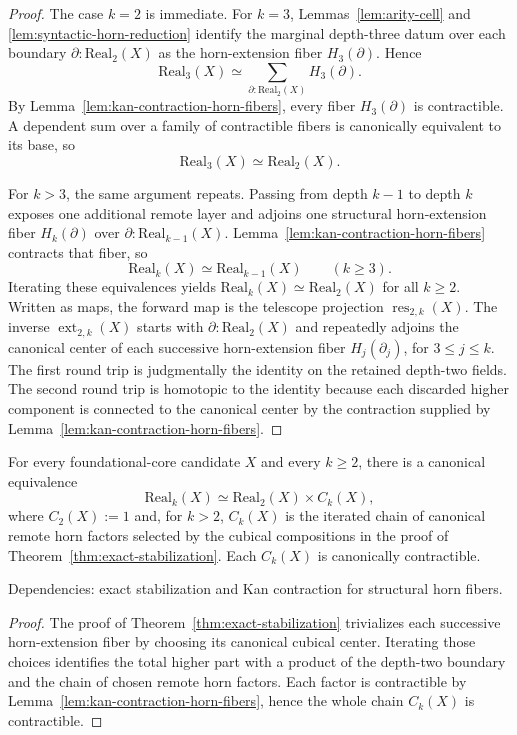 \documentclass{lmcs}
\newcommand{\res}{\operatorname{res}}
\newcommand{\ext}{\operatorname{ext}}
\begin{document}
\begin{proof}
The case \(k=2\) is immediate.  For \(k=3\), Lemmas~\ref{lem:arity-cell} and
\ref{lem:syntactic-horn-reduction} identify the marginal depth-three datum over each
boundary \(\partial:\mathrm{Real}_2(X)\) as the horn-extension fiber \(H_3(\partial)\).  Hence
\[
  \mathrm{Real}_3(X)
  \simeq
  \sum_{\partial:\mathrm{Real}_2(X)} H_3(\partial).
\]
By Lemma~\ref{lem:kan-contraction-horn-fibers}, every fiber \(H_3(\partial)\) is
contractible.  A dependent sum over a family of contractible fibers is canonically equivalent
to its base, so
\[
  \mathrm{Real}_3(X) \simeq \mathrm{Real}_2(X).
\]

For \(k>3\), the same argument repeats.  Passing from depth \(k-1\) to depth \(k\) exposes
one additional remote layer and adjoins one structural horn-extension fiber \(H_k(\partial)\)
over \(\partial:\mathrm{Real}_{k-1}(X)\).  Lemma~\ref{lem:kan-contraction-horn-fibers}
contracts that fiber, so
\[
  \mathrm{Real}_k(X) \simeq \mathrm{Real}_{k-1}(X)
  \qquad (k\geq 3).
\]
Iterating these equivalences yields \(\mathrm{Real}_k(X)\simeq\mathrm{Real}_2(X)\) for all
\(k\geq 2\).  Written as maps, the forward map is the telescope projection
\(\res_{2,k}(X)\).  The inverse \(\ext_{2,k}(X)\) starts with
\(\partial:\mathrm{Real}_2(X)\) and repeatedly adjoins the canonical center of each
successive horn-extension fiber \(H_j(\partial_j)\), for \(3\leq j\leq k\).
The first round trip is judgmentally the identity on the retained depth-two
fields.  The second round trip is homotopic to the identity because each
discarded higher component is connected to the canonical center by the
contraction supplied by Lemma~\ref{lem:kan-contraction-horn-fibers}.
\end{proof}

\begin{cor}
\label{cor:contractible-factor-decomposition}
For every foundational-core candidate \(X\) and every \(k\geq 2\), there is a canonical
equivalence
\[
  \mathrm{Real}_k(X)
  \simeq
  \mathrm{Real}_2(X) \times C_k(X),
\]
where \(C_2(X):=1\) and, for \(k>2\), \(C_k(X)\) is the iterated chain of canonical remote
horn factors selected by the cubical compositions in the proof of
Theorem~\ref{thm:exact-stabilization}.  Each \(C_k(X)\) is canonically contractible.

Dependencies: exact stabilization and Kan contraction for structural horn fibers.
\end{cor}

\begin{proof}
The proof of Theorem~\ref{thm:exact-stabilization} trivializes each successive horn-extension
fiber by choosing its canonical cubical center.  Iterating those choices identifies the total
higher part with a product of the depth-two boundary and the chain of chosen remote horn
factors.  Each factor is contractible by Lemma~\ref{lem:kan-contraction-horn-fibers}, hence
the whole chain \(C_k(X)\) is contractible.
\end{proof}
\end{document}
